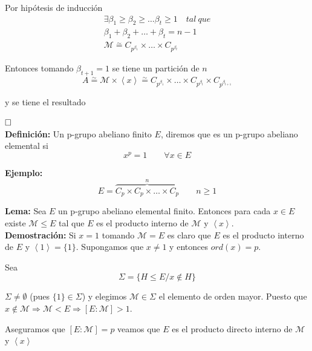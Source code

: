 \documentclass{article}
\begin{document}
Por hipótesis de inducción
\begin{gather*}
\exists\beta_1\geq\beta_2\geq \ldots \beta_t\geq 1\quad tal\:que \\
\beta_1+\beta_2+\ldots+\beta_t=n-1\\
\mathcal{M}\overset{\sim}{=}C_{p^{\beta_1}}\times \ldots \times C_{p^{\beta_t}}
\end{gather*}

Entonces tomando $\beta_{t+1}=1$ se tiene un partición de $n$
\begin{equation*}
A\overset{\sim}{=}\mathcal{M}\times \left\langle x\right\rangle \overset{\sim}{=}C_{p^{\beta_1}}\times \ldots \times C_{p^{\beta_t}}\times C_{p^{\beta_{t+1}}}
\end{equation*}

y se tiene el resultado

$\hfill\square$\\

\textbf{Definición:} Un p-grupo abeliano finito $E$, diremos que es un p-grupo abeliano elemental si 
\begin{equation*}
x^p=1\qquad \forall x\in E
\end{equation*}

\textbf{Ejemplo:}
\begin{equation*}
E=\overbrace{C_p\times C_p\times \ldots\times C_p}^n \qquad n\geq 1
\end{equation*}

\textbf{Lema:} Sea $E$ un p-grupo abeliano elemental finito. Entonces para cada $x\in E$ existe $\mathcal{M}\leq E$ tal que $E$ es el producto interno de $\mathcal{M}$ y $\left\langle x\right\rangle$. \\

\textbf{Demostración:} Si $x=1$ tomando $\mathcal{M}=E$ es claro que $E$ es el producto interno de $E$ y $\left\langle 1\right\rangle=\{1\}$. Supongamos que $x\neq 1$ y entonces $ord(x)=p$. 

Sea
\begin{equation*}
\Sigma =\{H\leq E/x\notin H\}
\end{equation*}

$\Sigma\neq \emptyset$ (pues $\{1\}\in \Sigma$) y elegimos $\mathcal{M}\in \Sigma$ el elemento de orden mayor. Puesto que $x\notin \mathcal{M}\Rightarrow\mathcal{M}<E\Rightarrow \left[E:\mathcal{M}\right]>1$.

Aseguramos que $\left[E:\mathcal{M}\right]=p$ veamos que $E$ es el producto directo interno de $\mathcal{M}$ y $\left\langle x\right\rangle$
\end{document}
